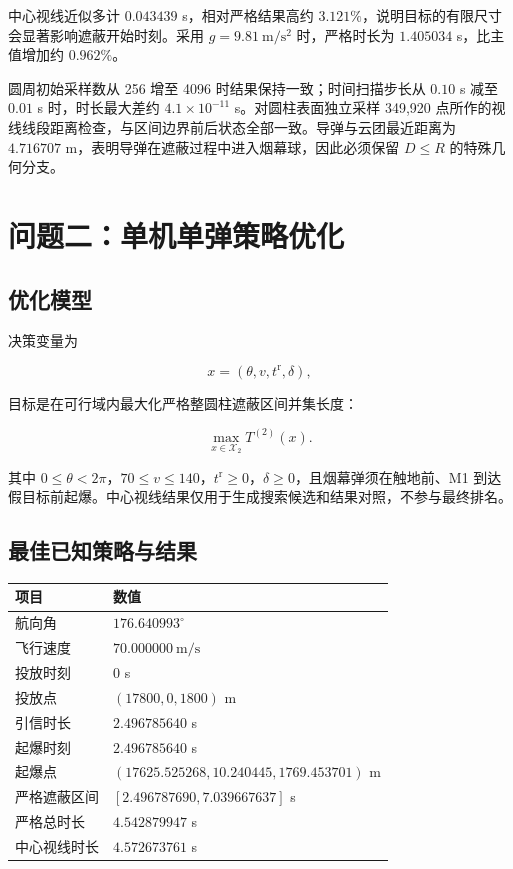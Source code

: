中心视线近似多计 $0.043439$ s，相对严格结果高约 $3.121\%$，说明目标的有限尺寸会显著影响遮蔽开始时刻。采用 $g=9.81\ \mathrm{m/s^2}$ 时，严格时长为 $1.405034$ s，比主值增加约 $0.962\%$。

圆周初始采样数从 256 增至 4096 时结果保持一致；时间扫描步长从 $0.10$ s 减至 $0.01$ s 时，时长最大差约 $4.1\times10^{-11}$ s。对圆柱表面独立采样 349,920 点所作的视线线段距离检查，与区间边界前后状态全部一致。导弹与云团最近距离为 $4.716707$ m，表明导弹在遮蔽过程中进入烟幕球，因此必须保留 $D\le R$ 的特殊几何分支。

\section{问题二：单机单弹策略优化}

\subsection{优化模型}

决策变量为

\[
x=(\theta,v,t^{\mathrm r},\delta),
\]

目标是在可行域内最大化严格整圆柱遮蔽区间并集长度：

\[
\max_{x\in\mathcal X_2}T^{(2)}(x).
\]

其中 $0\le\theta<2\pi$，$70\le v\le140$，$t^{\mathrm r}\ge0$，$\delta\ge0$，且烟幕弹须在触地前、M1 到达假目标前起爆。中心视线结果仅用于生成搜索候选和结果对照，不参与最终排名。

\subsection{最佳已知策略与结果}

\begin{center}
\small
\setlength{\tabcolsep}{3pt}
\renewcommand{\arraystretch}{1.18}
\begin{tabularx}{\linewidth}{|X|X|}
\hline
\rowcolor{gray!15} \textbf{项目} & \textbf{数值} \\
\hline
航向角 & $176.640993^\circ$ \\
\hline
飞行速度 & $70.000000\ \mathrm{m/s}$ \\
\hline
投放时刻 & $0$ s \\
\hline
投放点 & $(17800,0,1800)$ m \\
\hline
引信时长 & $2.496785640$ s \\
\hline
起爆时刻 & $2.496785640$ s \\
\hline
起爆点 & $(17625.525268,\allowbreak{}10.240445,\allowbreak{}1769.453701)$ m \\
\hline
严格遮蔽区间 & $[2.496787690,\allowbreak{}7.039667637]$ s \\
\hline
严格总时长 & $4.542879947$ s \\
\hline
中心视线时长 & $4.572673761$ s \\
\hline
\end{tabularx}
\end{center}

